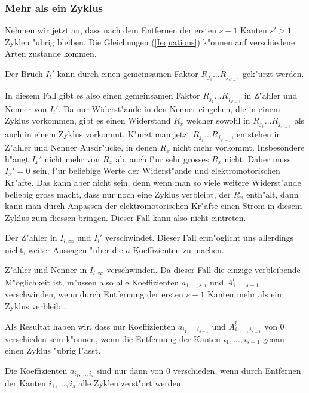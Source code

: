 \subsubsection{Mehr als ein Zyklus}
Nehmen wir jetzt an, dass nach dem Entfernen der ersten $s-1$ Kanten
$s'>1$ Zyklen "ubrig bleiben.
Die Gleichungen (\ref{Iequations}) k"onnen auf verschiedene Arten
zustande kommen.
\begin{compactenum}
\item Der Bruch $I_l'$ kann durch einen gemeinsamen Faktor
$R_{j_1}\dots R_{j_{s'-1}}$ gek"urzt werden.

In diesem Fall gibt es also einen gemeinsamen Faktor
$R_{j_1}\dots R_{j_{s'-1}}$ in Z"ahler und Nenner von $I_l'$.
Da nur Widerst"ande in den Nenner
eingehen, die in einem Zyklus vorkommen, gibt es einen Widerstand
$R_x$ welcher sowohl in $R_{j_1}\dots R_{j_{s'-1}}$ als auch in
einem Zyklus vorkommt.
K"urzt man jetzt $R_{j_1}\dots R_{j_{s'-1}}$, entstehen in Z"ahler und
Nenner Ausdr"ucke, in denen $R_x$ nicht mehr vorkommt. 
Insbesondere h"angt $I_x'$ nicht mehr von $R_x$ ab, auch f"ur sehr grosses
$R_x$ nicht. Daher muss $I_x'=0$ sein, f"ur beliebige Werte der Widerst"ande
und elektromotorischen Kr"afte.
Das kann aber nicht sein, denn wenn man so viele weitere Widerst"ande 
beliebig gross macht, dass nur noch eine Zyklus verbleibt, der $R_x$
enth"alt, dann kann man durch Anpassen der elektromotorischen Kr"afte
einen Strom in diesem Zyklus zum fliessen bringen. Dieser Fall kann
also nicht eintreten.
\item Der Z"ahler in $I_{l,\infty}$ und $I_l'$ verschwindet.
Dieser Fall erm"oglicht uns allerdings nicht, weiter Aussagen
"uber die $a$-Koeffizienten zu machen.
\item Z"ahler und Nenner in $I_{l,\infty}$ verschwinden.
Da dieser Fall die einzige verbleibende M"oglichkeit ist, m"ussen
also alle Koeffizienten $a_{1,\dots,s,i}$ und $A^l_{1,\dots,s-1}$
verschwinden, wenn durch Entfernung der ersten $s-1$ Kanten mehr als
ein Zyklus verbleibt.
\end{compactenum}
Als Resultat haben wir, dass nur Koeffizienten $a_{i_1,\dots,i_{s-1}}$
und $A_{i_1,\dots,i_{s-1}}^l$ von $0$ verschieden sein k"onnen, 
wenn die Entfernung der Kanten $i_1,\dots,i_{s-1}$ genau einen
Zyklus "ubrig l"asst.

\begin{hilfssatz}
Die Koeffizienten $a_{i_1,\dots,i_s}$ sind nur dann von $0$ verschieden,
wenn durch Entfernen der Kanten $i_1,\dots,i_s$ alle Zyklen zerst"ort
werden.
\end{hilfssatz}

